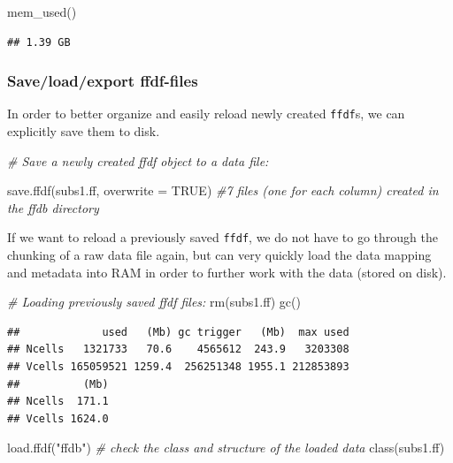 \documentclass[
  12pt,
]{style/krantz}
\newenvironment{Shaded}{\begin{snugshade}}{\end{snugshade}}
\newcommand{\AttributeTok}[1]{\textcolor[rgb]{0.77,0.63,0.00}{#1}}
\newcommand{\CommentTok}[1]{\textcolor[rgb]{0.56,0.35,0.01}{\textit{#1}}}
\newcommand{\ConstantTok}[1]{\textcolor[rgb]{0.00,0.00,0.00}{#1}}
\newcommand{\FunctionTok}[1]{\textcolor[rgb]{0.00,0.00,0.00}{#1}}
\newcommand{\NormalTok}[1]{#1}
\newcommand{\StringTok}[1]{\textcolor[rgb]{0.31,0.60,0.02}{#1}}
\begin{document}
\begin{Shaded}
\begin{Highlighting}[]
\FunctionTok{mem\_used}\NormalTok{()}
\end{Highlighting}
\end{Shaded}

\begin{verbatim}
## 1.39 GB
\end{verbatim}

\hypertarget{saveloadexport-ffdf-files}{%
\subsubsection{Save/load/export ffdf-files}\label{saveloadexport-ffdf-files}}

In order to better organize and easily reload newly created \texttt{ffdf}s, we can explicitly save them to disk.

\begin{Shaded}
\begin{Highlighting}[]
\CommentTok{\# Save a newly created ffdf object to a data file:}

\FunctionTok{save.ffdf}\NormalTok{(subs1.ff, }\AttributeTok{overwrite =} \ConstantTok{TRUE}\NormalTok{) }\CommentTok{\#7 files (one for each column) created in the ffdb directory}
\end{Highlighting}
\end{Shaded}

If we want to reload a previously saved \texttt{ffdf}, we do not have to go through the chunking of a raw data file again, but can very quickly load the data mapping and metadata into RAM in order to further work with the data (stored on disk).

\begin{Shaded}
\begin{Highlighting}[]
\CommentTok{\# Loading previously saved ffdf files:}
\FunctionTok{rm}\NormalTok{(subs1.ff)}
\FunctionTok{gc}\NormalTok{()}
\end{Highlighting}
\end{Shaded}

\begin{verbatim}
##             used   (Mb) gc trigger   (Mb)  max used
## Ncells   1321733   70.6    4565612  243.9   3203308
## Vcells 165059521 1259.4  256251348 1955.1 212853893
##          (Mb)
## Ncells  171.1
## Vcells 1624.0
\end{verbatim}

\begin{Shaded}
\begin{Highlighting}[]
\FunctionTok{load.ffdf}\NormalTok{(}\StringTok{"ffdb"}\NormalTok{)}
\CommentTok{\# check the class and structure of the loaded data}
\FunctionTok{class}\NormalTok{(subs1.ff) }
\end{Highlighting}
\end{Shaded}
\end{document}
